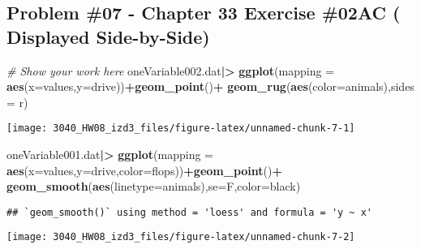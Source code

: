 \documentclass[
]{article}
\newenvironment{Shaded}{\begin{snugshade}}{\end{snugshade}}
\newcommand{\AttributeTok}[1]{\textcolor[rgb]{0.13,0.29,0.53}{#1}}
\newcommand{\CommentTok}[1]{\textcolor[rgb]{0.56,0.35,0.01}{\textit{#1}}}
\newcommand{\FunctionTok}[1]{\textcolor[rgb]{0.13,0.29,0.53}{\textbf{#1}}}
\newcommand{\NormalTok}[1]{#1}
\newcommand{\SpecialCharTok}[1]{\textcolor[rgb]{0.81,0.36,0.00}{\textbf{#1}}}
\newcommand{\StringTok}[1]{\textcolor[rgb]{0.31,0.60,0.02}{#1}}
\begin{document}
\newpage

\hypertarget{problem-07---chapter-33-exercise-02ac-displayed-side-by-side}{%
\subsection{Problem \#07 - Chapter 33 Exercise \#02AC ( Displayed
Side-by-Side)}\label{problem-07---chapter-33-exercise-02ac-displayed-side-by-side}}

\begin{Shaded}
\begin{Highlighting}[]
\CommentTok{\# Show your work here}
\NormalTok{oneVariable002.dat}\SpecialCharTok{|\textgreater{}}
  \FunctionTok{ggplot}\NormalTok{(}\AttributeTok{mapping =} \FunctionTok{aes}\NormalTok{(}\AttributeTok{x=}\NormalTok{values,}\AttributeTok{y=}\NormalTok{drive))}\SpecialCharTok{+}\FunctionTok{geom\_point}\NormalTok{()}\SpecialCharTok{+}
  \FunctionTok{geom\_rug}\NormalTok{(}\FunctionTok{aes}\NormalTok{(}\AttributeTok{color=}\NormalTok{animals),}\AttributeTok{sides =} \StringTok{\textquotesingle{}r\textquotesingle{}}\NormalTok{)}
\end{Highlighting}
\end{Shaded}

\texttt{[image: 3040\_HW08\_izd3\_files/figure-latex/unnamed-chunk-7-1]}

\begin{Shaded}
\begin{Highlighting}[]
\NormalTok{oneVariable001.dat}\SpecialCharTok{|\textgreater{}}
  \FunctionTok{ggplot}\NormalTok{(}\AttributeTok{mapping =} \FunctionTok{aes}\NormalTok{(}\AttributeTok{x=}\NormalTok{values,}\AttributeTok{y=}\NormalTok{drive,}\AttributeTok{color=}\NormalTok{flops))}\SpecialCharTok{+}\FunctionTok{geom\_point}\NormalTok{()}\SpecialCharTok{+}
  \FunctionTok{geom\_smooth}\NormalTok{(}\FunctionTok{aes}\NormalTok{(}\AttributeTok{linetype=}\NormalTok{animals),}\AttributeTok{se=}\NormalTok{F,}\AttributeTok{color=}\StringTok{\textquotesingle{}black\textquotesingle{}}\NormalTok{)}
\end{Highlighting}
\end{Shaded}

\begin{verbatim}
## `geom_smooth()` using method = 'loess' and formula = 'y ~ x'
\end{verbatim}

\texttt{[image: 3040\_HW08\_izd3\_files/figure-latex/unnamed-chunk-7-2]}

\newpage
\end{document}
